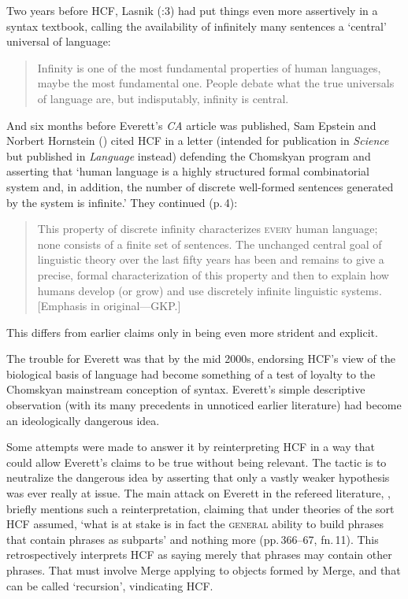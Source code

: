 \documentclass[output=paper,colorlinks,citecolor=brown
]{langscibook}
\begin{document}
Two years before HCF, Lasnik (\citeyear{Lasnik00}:3) had put things
even more assertively in a syntax textbook, calling the availability
of infinitely many sentences a `central' universal of language:
\begin{quote}
Infinity is one of the most fundamental properties of human languages,
maybe the most fundamental one. People debate what the true universals
of language are, but indisputably, infinity is central.
\end{quote}
And six months before Everett's \textit{CA} article was published,
Sam Epstein and Norbert Hornstein (\citeyear{EpstHorn05}) cited HCF in
a letter (intended for publication in \textit{Science} but published
in \textit{Language} instead) defending the Chomskyan program and asserting
that `human language is a highly structured formal combinatorial system
and, in addition, the number of discrete well-formed sentences generated
by the system is infinite.' They continued (p.\,4):
\begin{quote}
This property of discrete infinity characterizes \mbox{\textsc{every}}
human language; none consists of a finite set of sentences. The unchanged
central goal of linguistic theory over the last fifty years has been and
remains to give a precise, formal characterization of this property and
then to explain how humans develop (or grow) and use discretely infinite
linguistic systems. [Emphasis in original---GKP.]
\end{quote}
This differs from earlier claims only in being even more strident and
explicit.

The trouble for Everett was that by the mid 2000s, endorsing HCF's view
of the biological basis of language had become something of a test of
loyalty to the Chomskyan mainstream conception of syntax. Everett's
simple descriptive observation (with its many precedents in unnoticed
earlier literature) had become an ideologically dangerous idea.

Some attempts were made to answer it by reinterpreting HCF in a way
that could allow Everett's claims to be true without being relevant.
The tactic is to neutralize the dangerous idea by asserting that only
a vastly weaker hypothesis was ever really at issue. The main attack
on Everett in the refereed literature, \citet{NevPesRod09a}, briefly
mentions such a reinterpretation, claiming that under theories of the
sort HCF assumed, `what is at stake is in fact the \textsc{general}
ability to build phrases that contain phrases as subparts' and nothing
more (pp.\,366--67, fn.\,11). This retrospectively interprets HCF as
saying merely that phrases may contain other phrases. That must involve
Merge applying to objects formed by Merge, and that can be called
`recursion', vindicating HCF.
\end{document}
